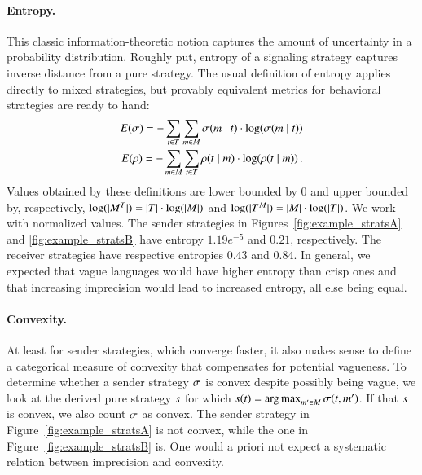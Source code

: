 \documentclass[fleqn,reqno,10pt]{article}
\begin{document}
\paragraph{Entropy.} This classic information-theoretic notion
captures the amount of uncertainty in a probability
distribution. Roughly put, entropy of a signaling strategy captures
inverse distance from a pure strategy. The usual definition of entropy
applies directly to mixed strategies, but provably equivalent metrics
for behavioral strategies are ready to hand:
\begin{align*}
  E(\sigma) = -\sum_{t \in T} \sum_{m \in M}
  \sigma(m \mid t) \cdot \log(\sigma(m \mid
  t)) \\
  E(\rho) = -\sum_{m \in M} \sum_{t \in T}
  \rho(t \mid m) \cdot \log(\rho(t \mid
  m)) \,. 
\end{align*}
Values obtained by these definitions are lower bounded by $0$ and
upper bounded by, respectively, $\log(|M^T|) = |T|
\cdot \log(|M|)$ and $\log(|T^M|) = |M| \cdot
\log(|T|)$. We work with normalized values. The sender
strategies in Figures~\ref{fig:example_stratsA} and
\ref{fig:example_stratsB} have entropy $1.19e^{-5}$ and $0.21$,
respectively. The receiver strategies have respective entropies $0.43$
and $0.84$. In general, we expected that vague languages would have
higher entropy than crisp ones and that increasing imprecision would
lead to increased entropy, all else being equal.

\paragraph{Convexity.} At least for sender strategies, which converge
faster, it also makes sense to define a categorical measure of
convexity that compensates for potential vagueness. To determine
whether a sender strategy $\sigma$ is convex despite possibly being
vague, we look at the derived pure strategy $s$ for which
$s(t) = \operatorname*{arg\,max}_{m' \in M}
\sigma(t,m')$. If that $s$ is convex, we also count
$\sigma$ as convex. The sender strategy in
Figure~\ref{fig:example_stratsA} is not convex, while the one in
Figure~\ref{fig:example_stratsB} is.  One would a priori not expect a
systematic relation between imprecision and convexity.
\end{document}
